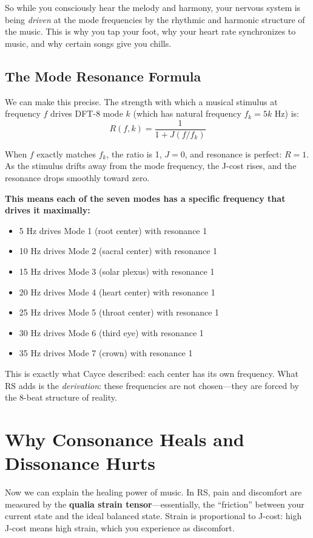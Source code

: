 \documentclass[11pt,a4paper]{article}
\begin{document}
So while you consciously hear the melody and harmony, your nervous system is being \emph{driven} at the mode frequencies by the rhythmic and harmonic structure of the music. This is why you tap your foot, why your heart rate synchronizes to music, and why certain songs give you chills.

\subsection{The Mode Resonance Formula}

We can make this precise. The strength with which a musical stimulus at frequency $f$ drives DFT-8 mode $k$ (which has natural frequency $f_k = 5k$ Hz) is:
\[
R(f, k) = \frac{1}{1 + J(f / f_k)}
\]

When $f$ exactly matches $f_k$, the ratio is 1, $J = 0$, and resonance is perfect: $R = 1$. As the stimulus drifts away from the mode frequency, the J-cost rises, and the resonance drops smoothly toward zero.

\textbf{This means each of the seven modes has a specific frequency that drives it maximally:}
\begin{itemize}
    \item 5 Hz drives Mode 1 (root center) with resonance 1
    \item 10 Hz drives Mode 2 (sacral center) with resonance 1
    \item 15 Hz drives Mode 3 (solar plexus) with resonance 1
    \item 20 Hz drives Mode 4 (heart center) with resonance 1
    \item 25 Hz drives Mode 5 (throat center) with resonance 1
    \item 30 Hz drives Mode 6 (third eye) with resonance 1
    \item 35 Hz drives Mode 7 (crown) with resonance 1
\end{itemize}

This is exactly what Cayce described: each center has its own frequency. What RS adds is the \emph{derivation}: these frequencies are not chosen---they are forced by the 8-beat structure of reality.

\section{Why Consonance Heals and Dissonance Hurts}

Now we can explain the healing power of music. In RS, pain and discomfort are measured by the \textbf{qualia strain tensor}---essentially, the ``friction'' between your current state and the ideal balanced state. Strain is proportional to J-cost: high J-cost means high strain, which you experience as discomfort.
\end{document}
